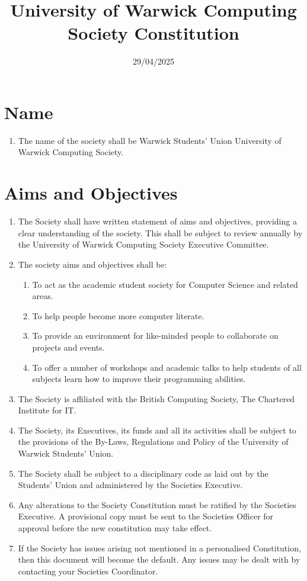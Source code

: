 \documentclass[a4paper,11pt,parskip=half-]{scrartcl} %
\title{University of Warwick Computing Society Constitution}
\date{29/04/2025}
\begin{document}
\maketitle

\section{Name}
\begin{enumerate}
    \item The name of the society shall be Warwick Students' Union University of Warwick Computing Society.
\end{enumerate}

\section{Aims and Objectives}
\begin{enumerate}
    \item The Society shall have written statement of aims and objectives, providing a clear understanding of the society. This shall be subject to review annually by the University of Warwick Computing Society Executive Committee.
    \item The society aims and objectives shall be:
    \begin{enumerate}
        \item To act as the academic student society for Computer Science and related areas.
        \item To help people become more computer literate.
        \item To provide an environment for like-minded people to collaborate on projects and events.
        \item To offer a number of workshops and academic talks to help students of all subjects learn how to improve their programming abilities.
    \end{enumerate}
    \item The Society is affiliated with the British Computing Society, The Chartered Institute for IT.
    \item The Society, its Executives, its funds and all its activities shall be subject to the provisions of the By-Laws, Regulations and Policy of the University of Warwick Students' Union.
    \item The Society shall be subject to a disciplinary code as laid out by the Students' Union and administered by the Societies Executive.
    \item Any alterations to the Society Constitution must be ratified by the Societies Executive. A provisional copy must be sent to the Societies Officer for approval before the new constitution may take effect.
    \item If the Society has issues arising not mentioned in a personalised Constitution, then this document will become the default. Any issues may be dealt with by contacting your Societies Coordinator.
\end{enumerate}
\end{document}
